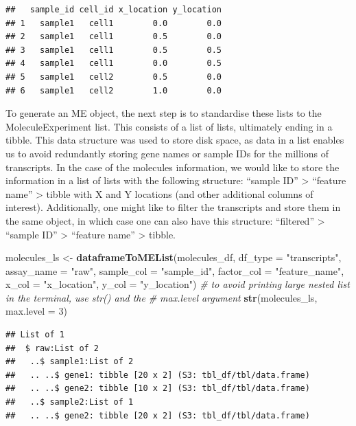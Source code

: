 \documentclass[
]{article}
\newenvironment{Shaded}{\begin{snugshade}}{\end{snugshade}}
\newcommand{\CommentTok}[1]{\textcolor[rgb]{0.56,0.35,0.01}{\textit{#1}}}
\newcommand{\DataTypeTok}[1]{\textcolor[rgb]{0.13,0.29,0.53}{#1}}
\newcommand{\DecValTok}[1]{\textcolor[rgb]{0.00,0.00,0.81}{#1}}
\newcommand{\KeywordTok}[1]{\textcolor[rgb]{0.13,0.29,0.53}{\textbf{#1}}}
\newcommand{\NormalTok}[1]{#1}
\newcommand{\StringTok}[1]{\textcolor[rgb]{0.31,0.60,0.02}{#1}}
\begin{document}
\begin{verbatim}
##   sample_id cell_id x_location y_location
## 1   sample1   cell1        0.0        0.0
## 2   sample1   cell1        0.5        0.0
## 3   sample1   cell1        0.5        0.5
## 4   sample1   cell1        0.0        0.5
## 5   sample1   cell2        0.5        0.0
## 6   sample1   cell2        1.0        0.0
\end{verbatim}

To generate an ME object, the next step is to standardise these lists to
the MoleculeExperiment list. This consists of a list of lists,
ultimately ending in a tibble. This data structure was used to store
disk space, as data in a list enables us to avoid redundantly storing
gene names or sample IDs for the millions of transcripts. In the case of
the molecules information, we would like to store the information in a
list of lists with the following structure: ``sample ID'' \textgreater{}
``feature name'' \textgreater{} tibble with X and Y locations (and other
additional columns of interest). Additionally, one might like to filter
the transcripts and store them in the same object, in which case one can
also have this structure: ``filtered'' \textgreater{} ``sample ID''
\textgreater{} ``feature name'' \textgreater{} tibble.

\begin{Shaded}
\begin{Highlighting}[]
\NormalTok{molecules\_ls \textless{}{-}}\StringTok{ }\KeywordTok{dataframeToMEList}\NormalTok{(molecules\_df,}
                                  \DataTypeTok{df\_type =} \StringTok{"transcripts"}\NormalTok{,}
                                  \DataTypeTok{assay\_name =} \StringTok{"raw"}\NormalTok{,}
                                  \DataTypeTok{sample\_col =} \StringTok{"sample\_id"}\NormalTok{,}
                                  \DataTypeTok{factor\_col =} \StringTok{"feature\_name"}\NormalTok{,}
                                  \DataTypeTok{x\_col =} \StringTok{"x\_location"}\NormalTok{,}
                                  \DataTypeTok{y\_col =} \StringTok{"y\_location"}\NormalTok{)}
\CommentTok{\# to avoid printing large nested list in the terminal, use str() and the}
\CommentTok{\# max.level argument}
\KeywordTok{str}\NormalTok{(molecules\_ls, }\DataTypeTok{max.level =} \DecValTok{3}\NormalTok{)}
\end{Highlighting}
\end{Shaded}

\begin{verbatim}
## List of 1
##  $ raw:List of 2
##   ..$ sample1:List of 2
##   .. ..$ gene1: tibble [20 x 2] (S3: tbl_df/tbl/data.frame)
##   .. ..$ gene2: tibble [10 x 2] (S3: tbl_df/tbl/data.frame)
##   ..$ sample2:List of 1
##   .. ..$ gene2: tibble [20 x 2] (S3: tbl_df/tbl/data.frame)
\end{verbatim}
\end{document}
